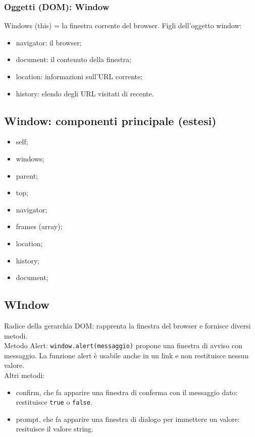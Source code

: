 \documentclass{article}
\begin{document}
\subsubsection{Oggetti (DOM): Window}
Windows (this) = la finestra corrente del browser. Figli dell'oggetto window:
\begin{itemize}
    \item navigator: il browser;
    \item document: il contenuto della finestra;
    \item location: informazioni sull'URL corrente;
    \item history: elendo degli URL visitati di recente.
\end{itemize}
\subsection{Window: componenti principale (estesi)}
\begin{itemize}
    \item self;
    \item windows;
    \item parent;
    \item top;
    \item navigator;
    \item frames (array);
    \item location;
    \item history;
    \item document;
\end{itemize}
\subsection{WIndow}
Radice della gerarchia DOM: rapprenta la finestra del browser e fornisce diversi metodi.
\\ Metodo Alert: \texttt{window.alert(messaggio)} propone una finestra di avviso con messaggio.
La funzione alert è usabile anche in un link e non restituisce nessun valore.
\\ Altri metodi:
\begin{itemize}
    \item confirm, che fa apparire una finestra di conferma con il messaggio dato: restituisce \texttt{true} o \texttt{false}.
    \item prompt, che fa apparire una finestra di dialogo per immettere un valore: resituisce il valore string.
\end{itemize}
\end{document}
